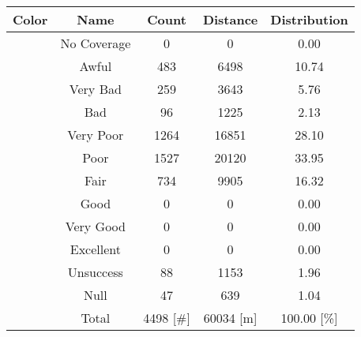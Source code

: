 \begin{tabular}{|c|c|c|c|c|}\hline
\rowcolor{Plum!20}
Color&Name&Count&Distance&Distribution\\\hline\hline
\cellcolor[HTML]{aaaaaa} &No Coverage&0&0&0.00\\\hline
\cellcolor[HTML]{820000} &Awful&483&6498&10.74\\\hline
\cellcolor[HTML]{dc143c} &Very Bad&259&3643&5.76\\\hline
\cellcolor[HTML]{ff0000} &Bad&96&1225&2.13\\\hline
\cellcolor[HTML]{fa6400} &Very Poor&1264&16851&28.10\\\hline
\cellcolor[HTML]{ffaa00} &Poor&1527&20120&33.95\\\hline
\cellcolor[HTML]{ffff00} &Fair&734&9905&16.32\\\hline
\cellcolor[HTML]{00d228} &Good&0&0&0.00\\\hline
\cellcolor[HTML]{00a032} &Very Good&0&0&0.00\\\hline
\cellcolor[HTML]{00703c} &Excellent&0&0&0.00\\\hline
\cellcolor[HTML]{1e90ff} &Unsuccess&88&1153&1.96\\\hline
\cellcolor[HTML]{000000} &Null&47&639&1.04\\\hline
\cellcolor[HTML]{ffffff} &Total&4498 [\#]&60034 [m]&100.00 [\%]\\\hline
\end{tabular}
